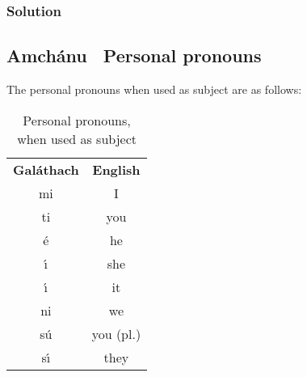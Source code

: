 \subsubsection{Solution}
\begin{table}[H]
\centering
{}
\label{solution_present_tense}
\caption{Solution: present tense}
\end{table}
\newpage

\subsection{Amch\'{a}nu \textendash\ Personal pronouns}

The personal pronouns when used as subject are as follows:
\begin{table}[H]
\centering
\begin{tabular}{cc}
  \toprule
  \textbf{Gal\'{a}thach} & \textbf{English}\\
  \cmidrule(lr){1-1}\cmidrule{2-2}
  mi & I \\
  ti & you\\
  \'{e} & he\\
  \'{\i} & she\\
  \'{\i} & it\\
  ni & we\\
  s\'{u} & you (pl.)\\
  s\'{\i} & they\\
  \bottomrule
\end{tabular}
\caption{Personal pronouns, when used as subject}
\label{personal_pronouns_as_subject}
\end{table}

